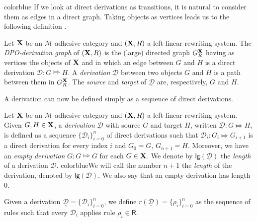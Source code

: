 \documentclass[a4paper,UKenglish,cleveref,pdftex,thm-restate,numberwithinsect]{lipics-v2021}
\newcommand{\full}[1]{{color{blue}#1}}
\newcommand{\full}[1]{}
\def\R{\mathsf{R}}
\def\X{\textbf {\textup{X}}}
\newcommand{\dder}[1]{\mathscr{#1}}
\newcommand{\der}[1]{\underline{\dder{#1}}}
\def\gpo{\mathsf{G}^{\X}_R}
\newcommand{\lgh}[0]{\mathsf{lg}}
\begin{document}
\full{
  If we look at direct derivations as
  transitions, it is natural to consider them as edges in a direct
  graph. Taking objects as vertices leads us to the following
  definition \cite{heindel2009category}.

  \begin{definition}
    Let  $\X$ be an $\mathcal{M}$-adhesive category and 
    $(\X, \R)$ a left-linear rewriting system. 
    The \emph{DPO-derivation graph} of
    $(\X, \R)$ is the (large) directed graph $\gpo$ having as vertices
    the objects of $\X$ and in which an edge between $G$ and $H$ is a
    direct derivation $\dder{D}\colon G\Mapsto H$. A \emph{derivation}
    $\der{D}$ between two objects $G$ and $H$ is a path between them
    in $\gpo$. The \emph{source} and \emph{target} of $\der{D}$ are,
    respectively, $G$ and $H$.
  \end{definition}
}

A derivation can now be defined simply as a sequence of direct derivations.

\begin{definition}[Derivation]
  Let $\X$ be an $\mathcal{M}$-adhesive category and $(\X, \R)$ a
  left-linear rewriting system.  Given $G, H \in \X$, a
  \emph{derivation} $\der{D}$ with source $G$ and target $H$, written
  $\der{D}: G \Mapsto H$, is defined as a sequence
  $\{\dder{D}_i\}_{i=0}^n$ of direct derivations such that
  $\dder{D}_i : G_i \Mapsto G_{i+1}$ is a direct derivation for every
  index $i$ and $G_0=G$, $G_{n+1}=H$.
  Moreover, we have an \emph{empty derivation} $G : G \Mapsto G$ for each $G \in \X$.
  We denote by $\lgh(\der{D})$ the \emph{length} of a derivation $\der{D}$.
  \full{We will call the number $n+1$ the \emph{length} of the derivation,
  denoted by $\lgh(\der{D})$. We also say that an empty
  derivation has length $0$.}

 Given a derivation $\der{D}=\{\dder{D}_i\}_{i=0}^n$, we define $r(\der{D})  = \{\rho_i\}_{i=0}^n$ as the sequence of 
 rules such that every $\dder{D}_i$ applies rule $\rho_i\in \R$.  
\end{definition}
\end{document}
